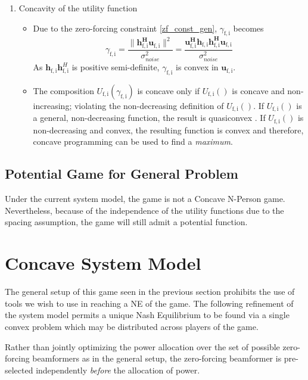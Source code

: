 \documentclass[12pt,a4paper]{report}
\begin{document}
\begin{enumerate}
\item Concavity of the utility function
\begin{itemize}
\item 
Due to the zero-forcing constraint \eqref{zf_const_gen}, $\gamma_{\mathrm{f,i}}$ becomes
	\begin{equation}\label{zf_snr}
	\gamma_{\mathrm{f,i}} = \frac{\|\mathbf{h^H_{\mathrm{f,i}}u_{\mathrm{f,i}}}\|^2}
	{\sigma^2_{noise}  
	}
	= 
	\frac{\mathbf{u^H_{\mathrm{f,i}}h_{\mathrm{f,i}}h^H_{\mathrm{f,i}}u_{\mathrm{f,i}}}}
	{\sigma^2_{noise}  
	}
	\end{equation}
	As $\mathbf{h}_{\mathrm{f,i}}\mathbf{h}^H_{\mathrm{f,i}}$ is positive semi-definite, $\gamma_{\mathrm{f,i}}$ is convex in ${\mathbf{u}_{\mathrm{f,i}}}$. 
\item
The composition $U_{\mathrm{f,i}}(\gamma_{\mathrm{f,i}}) $ is concave only if $U_{\mathrm{f,i}}() $ is concave and non-increasing; violating the non-decreasing definition of $U_{\mathrm{f,i}}() $.
If $U_{\mathrm{f,i}}() $ is a general, non-decreasing function, the result is quasiconvex \cite[p.~102]{BoV:04}. If $U_{\mathrm{f,i}}() $ is  non-decreasing and convex, the resulting
   function is convex and therefore, concave programming can be used to find a \emph{maximum}. 
\end{itemize}

\end{enumerate}

\subsection{Potential Game for General Problem}
Under the current system model, the game is not a Concave N-Person game. Nevertheless, because of the independence of the utility functions due to the spacing assumption, the game will still admit a potential function.


\section{Concave System Model}\label{conmodel}

The general setup of this game seen in the previous section prohibits the use of tools we wish to use in reaching a NE of the game.
The following refinement of the system model permits a unique Nash Equilibrium to be found via a single convex problem which may be distributed across players of the game.
\par
Rather than jointly optimizing the power allocation over the set of possible zero-forcing beamformers as in the general setup, the zero-forcing beamformer is pre-selected independently \emph{before} the allocation of power. 
\end{document}
